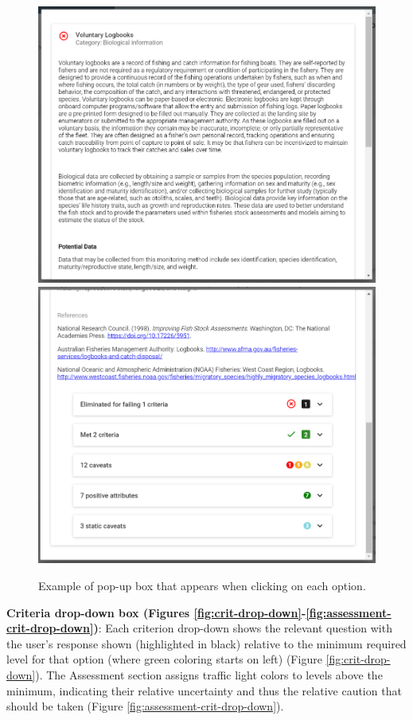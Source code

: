 \documentclass[
  11pt,
]{book}
\begin{document}
\begin{figure}

{\centering \includegraphics[width=0.5\linewidth]{images/option-description} \includegraphics[width=0.5\linewidth]{images/option-result-details} 

}

\caption{Example of pop-up box that appears when clicking on each option.}\label{fig:opt-desc}
\end{figure}

\textbf{Criteria drop-down box (Figures \ref{fig:crit-drop-down}-\ref{fig:assessment-crit-drop-down})}: Each criterion drop-down shows the relevant question with the user's response shown (highlighted in black) relative to the minimum required level for that option (where green coloring starts on left) (Figure \ref{fig:crit-drop-down}). The Assessment section assigns traffic light colors to levels above the minimum, indicating their relative uncertainty and thus the relative caution that should be taken (Figure \ref{fig:assessment-crit-drop-down}).
\end{document}
